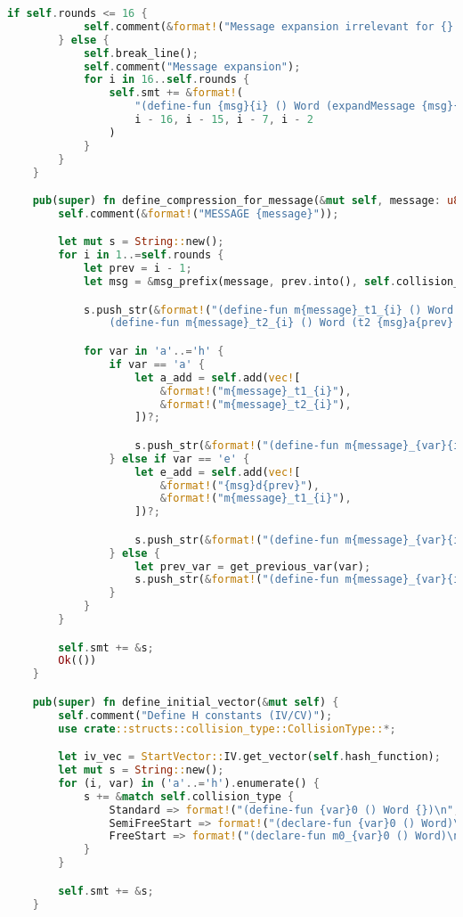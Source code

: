 \begin{lstlisting}[language=rust, caption={smt\_lib/encodings/generic\_shared.rs}]
		if self.rounds <= 16 {
			self.comment(&format!("Message expansion irrelevant for {} rounds", self.rounds));
		} else {
			self.break_line();
			self.comment("Message expansion");
			for i in 16..self.rounds {
				self.smt += &format!(
					"(define-fun {msg}{i} () Word (expandMessage {msg}{} {msg}{} {msg}{} {msg}{}))\n",
					i - 16, i - 15, i - 7, i - 2
				)
			}
		}
	}

	pub(super) fn define_compression_for_message(&mut self, message: u8) -> Result<(), Box<dyn Error>> {
		self.comment(&format!("MESSAGE {message}"));

		let mut s = String::new();
		for i in 1..=self.rounds {
			let prev = i - 1;
			let msg = &msg_prefix(message, prev.into(), self.collision_type);

			s.push_str(&format!("(define-fun m{message}_t1_{i} () Word (t1 {msg}h{prev} {msg}e{prev} {msg}f{prev} {msg}g{prev} k{prev} m{message}_w{prev}))\n\
				(define-fun m{message}_t2_{i} () Word (t2 {msg}a{prev} {msg}b{prev} {msg}c{prev}))\n"));

			for var in 'a'..='h' {
				if var == 'a' {
					let a_add = self.add(vec![
						&format!("m{message}_t1_{i}"),
						&format!("m{message}_t2_{i}"),
					])?;

					s.push_str(&format!("(define-fun m{message}_{var}{i} () Word {a_add})\n"))
				} else if var == 'e' {
					let e_add = self.add(vec![
						&format!("{msg}d{prev}"),
						&format!("m{message}_t1_{i}"),
					])?;

					s.push_str(&format!("(define-fun m{message}_{var}{i} () Word {e_add})\n"))
				} else {
					let prev_var = get_previous_var(var);
					s.push_str(&format!("(define-fun m{message}_{var}{i} () Word {msg}{prev_var}{prev})\n"))
				}
			}
		}

		self.smt += &s;
		Ok(())
	}

	pub(super) fn define_initial_vector(&mut self) {
		self.comment("Define H constants (IV/CV)");
		use crate::structs::collision_type::CollisionType::*;

		let iv_vec = StartVector::IV.get_vector(self.hash_function);
		let mut s = String::new();
		for (i, var) in ('a'..='h').enumerate() {
			s += &match self.collision_type {
				Standard => format!("(define-fun {var}0 () Word {})\n", smt_hex(iv_vec[i], &self.hash_function)),
				SemiFreeStart => format!("(declare-fun {var}0 () Word)\n"),
				FreeStart => format!("(declare-fun m0_{var}0 () Word)\n(declare-fun m1_{var}0 () Word)\n"),
			}
		}

		self.smt += &s;
	}


\end{lstlisting}
